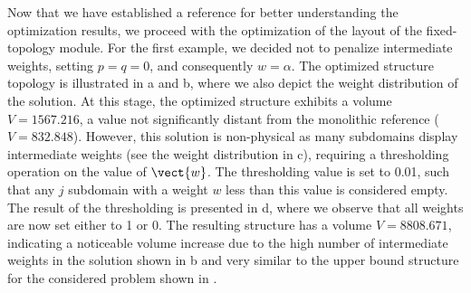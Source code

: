 Now that we have established a reference for better understanding the optimization results, we proceed with the optimization of the layout of the fixed-topology module. For the first example, we decided not to penalize intermediate weights, setting $p=q=0$, and consequently $w=\alpha$. The optimized structure topology is illustrated in a and b, where we also depict the weight distribution of the solution. At this stage, the optimized structure exhibits a volume $V = 1567.216$, a value not significantly distant from the monolithic reference ($V=832.848$). However, this solution is non-physical as many subdomains display intermediate weights (see the weight distribution in c), requiring a thresholding operation on the value of $\vect{w}$. The thresholding value is set to 0.01, such that any $j$ subdomain with a weight $w$ less than this value is considered empty. The result of the thresholding is presented in d, where we observe that all weights are now set either to 1 or 0. The resulting structure has a volume $V = 8808.671$, indicating a noticeable volume increase due to the high number of intermediate weights in the solution shown in b and very similar to the upper bound structure for the considered problem shown in .

